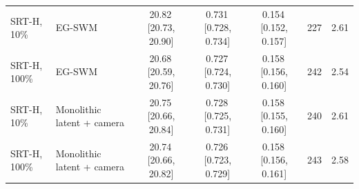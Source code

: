 \begin{tabular}{llccccc}
SRT-H, 10\% & EG-SWM & 20.82\,{\scriptsize[20.73, 20.90]} & 0.731\,{\scriptsize[0.728, 0.734]} & 0.154\,{\scriptsize[0.152, 0.157]} & 227 & 2.61 \\
SRT-H, 100\% & EG-SWM & 20.68\,{\scriptsize[20.59, 20.76]} & 0.727\,{\scriptsize[0.724, 0.730]} & 0.158\,{\scriptsize[0.156, 0.160]} & 242 & 2.54 \\
SRT-H, 10\% & Monolithic latent + camera & 20.75\,{\scriptsize[20.66, 20.84]} & 0.728\,{\scriptsize[0.725, 0.731]} & 0.158\,{\scriptsize[0.155, 0.160]} & 240 & 2.61 \\
SRT-H, 100\% & Monolithic latent + camera & 20.74\,{\scriptsize[20.66, 20.82]} & 0.726\,{\scriptsize[0.723, 0.729]} & 0.158\,{\scriptsize[0.156, 0.161]} & 243 & 2.58 \\
\bottomrule
\end{tabular}
